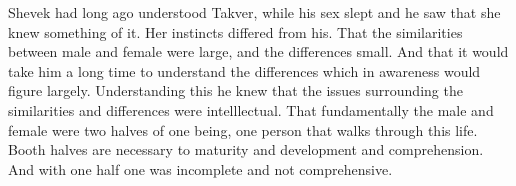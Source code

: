 Shevek had long ago understood Takver, while his sex slept and he saw
that she knew something of it.  Her instincts differed from his.  That
the similarities between male and female were large, and the
differences small.  And that it would take him a long time to
understand the differences which in awareness would figure largely.
Understanding this he knew that the issues surrounding the
similarities and differences were intelllectual.  That fundamentally
the male and female were two halves of one being, one person that
walks through this life.  Booth halves are necessary to maturity and
development and comprehension.  And with one half one was incomplete
and not comprehensive.

